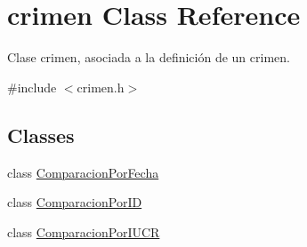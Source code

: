 \hypertarget{classcrimen}{}\section{crimen Class Reference}
\label{classcrimen}


Clase crimen, asociada a la definición de un crimen.  




{\ttfamily \#include $<$crimen.\+h$>$}

\subsection*{Classes}
\begin{DoxyCompactItemize}
\item 
class \hyperlink{classcrimen_1_1ComparacionPorFecha}{Comparacion\+Por\+Fecha}
\item 
class \hyperlink{classcrimen_1_1ComparacionPorID}{Comparacion\+Por\+I\+D}
\item 
class \hyperlink{classcrimen_1_1ComparacionPorIUCR}{Comparacion\+Por\+I\+U\+C\+R}
\end{DoxyCompactItemize}
